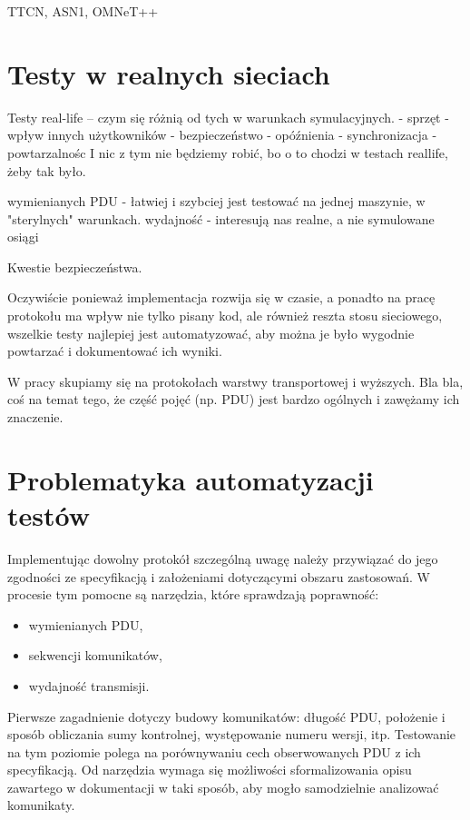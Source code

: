 \documentclass[00-praca-magisterska.tex]{subfiles}
\begin{document}
TTCN, ASN1, OMNeT++

\section{Testy w realnych sieciach}

Testy real-life -- czym się różnią od tych w warunkach symulacyjnych.
 - sprzęt
 - wpływ innych użytkowników
 - bezpieczeństwo
 - opóźnienia
 - synchronizacja
 - powtarzalnośc
I nic z tym nie będziemy robić, bo o to chodzi w testach reallife, żeby tak
było.

wymienianych PDU - łatwiej i szybciej jest testować na jednej maszynie, w "sterylnych" warunkach.
wydajność - interesują nas realne, a nie symulowane osiągi

Kwestie bezpieczeństwa.

Oczywiście ponieważ implementacja rozwija się w czasie, a ponadto na pracę
protokołu ma wpływ nie tylko pisany kod, ale również reszta stosu sieciowego,
wszelkie testy najlepiej jest automatyzować, aby można je było wygodnie
powtarzać i dokumentować ich wyniki.

W pracy skupiamy się na protokołach warstwy transportowej i wyższych. Bla bla,
coś na temat tego, że część pojęć (np. PDU) jest bardzo ogólnych i zawężamy ich
znaczenie.

\section{Problematyka automatyzacji testów}

Implementując dowolny protokół szczególną uwagę należy przywiązać do jego
zgodności ze specyfikacją i założeniami dotyczącymi obszaru zastosowań.
W procesie tym pomocne są narzędzia, które sprawdzają poprawność:
\begin{itemize}
  \item{wymienianych PDU,}
  \item{sekwencji komunikatów,}
  \item{wydajność transmisji.}
\end{itemize}

Pierwsze zagadnienie dotyczy budowy komunikatów: długość PDU, położenie i sposób
obliczania sumy kontrolnej, występowanie numeru wersji, itp. Testowanie na tym
poziomie polega na porównywaniu cech obserwowanych PDU z ich specyfikacją. Od
narzędzia wymaga się możliwości sformalizowania opisu zawartego w dokumentacji w
taki sposób, aby mogło samodzielnie analizować komunikaty.
\end{document}

